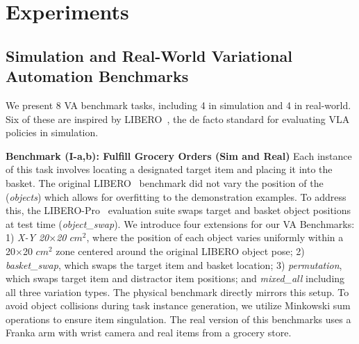
\section{Experiments}



\subsection{Simulation and Real-World Variational Automation Benchmarks}
We present 8 VA benchmark tasks, including 4 in simulation and 4 in real-world.
Six of these are inspired by  LIBERO~\citep{liu2023libero}, the de facto standard for evaluating VLA policies in simulation.

\textbf{Benchmark (I-a,b): Fulfill Grocery Orders (Sim and Real)} Each instance of this task involves locating a designated target item and placing it into the basket. The original LIBERO~\cite{liu2023libero} benchmark did not vary the position of the  (\textit{objects}) which allows for overfitting to the demonstration examples. To address this, the {LIBERO-Pro}~\citep{zhou2025liberopro} evaluation suite swaps target and basket object positions at test time (\textit{object\_swap}). We introduce four extensions for our VA Benchmarks: 1) \textit{X-Y 20$\times$20 {\small{$cm^2$}}}, where the position of each object varies uniformly within a 20$\times$20 {\small{$cm^2$}} zone centered around the original LIBERO object pose; 2) \textit{basket\_swap}, which swaps the target item and basket location; 3) \textit{permutation}, which swaps target item and distractor item positions; and \textit{mixed\_all} including all three variation types. The physical benchmark directly mirrors this setup.
To avoid object collisions during task instance generation, we utilize Minkowski sum~\cite{minkowski1896geometrie} operations to ensure item singulation.  The real version of this benchmarks uses a Franka arm with wrist camera and  real items from a grocery store.  

